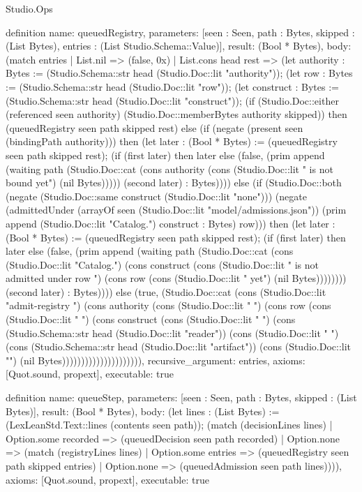 \begin{lexlean}{Studio.Ops}
\begin{semanticmodule}
{definition{
  name: queuedRegistry,
  parameters: [seen : Seen, path : Bytes, skipped : (List Bytes), entries : (List Studio.Schema::Value)],
  result: (Bool * Bytes),
  body: (match entries
    | List.nil => (false, 0x)
    | List.cons head rest => (let authority : Bytes := (Studio.Schema::str head (Studio.Doc::lit "authority")); (let row : Bytes := (Studio.Schema::str head (Studio.Doc::lit "row")); (let construct : Bytes := (Studio.Schema::str head (Studio.Doc::lit "construct")); (if (Studio.Doc::either (referenced seen authority) (Studio.Doc::memberBytes authority skipped)) then (queuedRegistry seen path skipped rest) else (if (negate (present seen (bindingPath authority))) then (let later : (Bool * Bytes) := (queuedRegistry seen path skipped rest); (if (first later) then later else (false, (prim append (waiting path (Studio.Doc::cat (cons authority (cons (Studio.Doc::lit " is not bound yet") (nil Bytes))))) (second later) : Bytes)))) else (if (Studio.Doc::both (negate (Studio.Doc::same construct (Studio.Doc::lit "none"))) (negate (admittedUnder (arrayOf seen (Studio.Doc::lit "model/admissions.json")) (prim append (Studio.Doc::lit "Catalog.") construct : Bytes) row))) then (let later : (Bool * Bytes) := (queuedRegistry seen path skipped rest); (if (first later) then later else (false, (prim append (waiting path (Studio.Doc::cat (cons (Studio.Doc::lit "Catalog.") (cons construct (cons (Studio.Doc::lit " is not admitted under row ") (cons row (cons (Studio.Doc::lit " yet") (nil Bytes)))))))) (second later) : Bytes)))) else (true, (Studio.Doc::cat (cons (Studio.Doc::lit "admit-registry ") (cons authority (cons (Studio.Doc::lit " ") (cons row (cons (Studio.Doc::lit " ") (cons construct (cons (Studio.Doc::lit " ") (cons (Studio.Schema::str head (Studio.Doc::lit "reader")) (cons (Studio.Doc::lit " ") (cons (Studio.Schema::str head (Studio.Doc::lit "artifact")) (cons (Studio.Doc::lit "\n") (nil Bytes))))))))))))))))))))),
  recursive_argument: entries,
  axioms: [Quot.sound, propext],
  executable: true
}

definition{
  name: queueStep,
  parameters: [seen : Seen, path : Bytes, skipped : (List Bytes)],
  result: (Bool * Bytes),
  body: (let lines : (List Bytes) := (LexLeanStd.Text::lines (contents seen path)); (match (decisionLines lines)
    | Option.some recorded => (queuedDecision seen path recorded)
    | Option.none => (match (registryLines lines)
      | Option.some entries => (queuedRegistry seen path skipped entries)
      | Option.none => (queuedAdmission seen path lines)))),
  axioms: [Quot.sound, propext],
  executable: true
}

}
\end{semanticmodule}
\end{lexlean}
